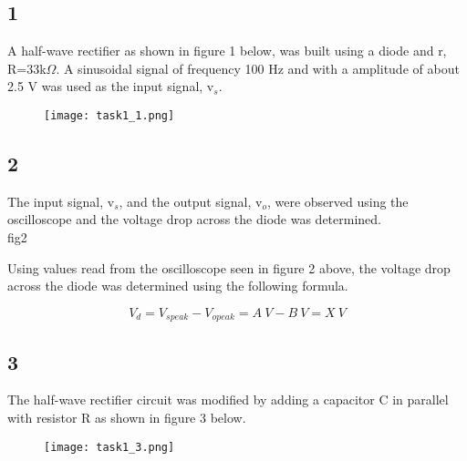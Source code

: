 \subsection*{1}

    A half-wave rectifier as shown in figure 1 below, was built using a  diode and r, R=33k$\Omega$.
    A sinusoidal signal of frequency 100 Hz and with a amplitude of about 2.5 V was used as the input signal, v$_s$.\\

    \begin{figure}[h!]
        \centering
        \texttt{[image: task1\_1.png]}
    \end{figure}

\subsection*{2}

    The input signal, v$_s$, and the output signal, v$_o$, were observed using the oscilloscope and the voltage drop across the diode was determined.\\

    fig2%

    Using values read from the oscilloscope seen in figure 2 above, the voltage drop across the diode was determined using the following formula.

    $$V_d = V_{s peak} - V_{o peak} = A\ V - B\ V = X\ V$$

\subsection*{3}

    The half-wave rectifier circuit was modified by adding a capacitor C in parallel with resistor R as shown in figure 3 below.

    \begin{figure}[h!]
        \centering
        \texttt{[image: task1\_3.png]}
    \end{figure}

